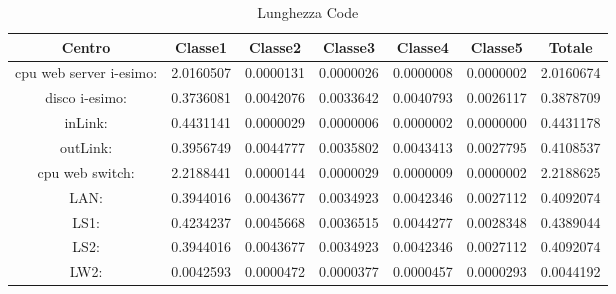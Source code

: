 \begin{table}[H]
\begin{center}\begin{scriptsize}
\begin{tabular}{||c|c|c|c|c|c|c||}
\hline
Centro &Classe1 &Classe2 &Classe3 &Classe4 &Classe5 &Totale\\
\hline
\hline
 cpu web server i-esimo: 	&2.0160507	&0.0000131	&0.0000026	&0.0000008	&0.0000002	&2.0160674	\\\hline
 disco i-esimo: 	&0.3736081	&0.0042076	&0.0033642	&0.0040793	&0.0026117	&0.3878709	\\\hline
 inLink: 	&0.4431141	&0.0000029	&0.0000006	&0.0000002	&0.0000000	&0.4431178	\\\hline
 outLink: 	&0.3956749	&0.0044777	&0.0035802	&0.0043413	&0.0027795	&0.4108537	\\\hline
 cpu web switch: 	&2.2188441	&0.0000144	&0.0000029	&0.0000009	&0.0000002	&2.2188625	\\\hline
 LAN: 	&0.3944016	&0.0043677	&0.0034923	&0.0042346	&0.0027112	&0.4092074	\\\hline
 LS1: 	&0.4234237	&0.0045668	&0.0036515	&0.0044277	&0.0028348	&0.4389044	\\\hline
 LS2: 	&0.3944016	&0.0043677	&0.0034923	&0.0042346	&0.0027112	&0.4092074	\\\hline
 LW2: 	&0.0042593	&0.0000472	&0.0000377	&0.0000457	&0.0000293	&0.0044192	\\\hline
\end{tabular}
\end{scriptsize}\end{center}
\caption{Lunghezza Code}
\label{lunghezzacode}
\end{table}

